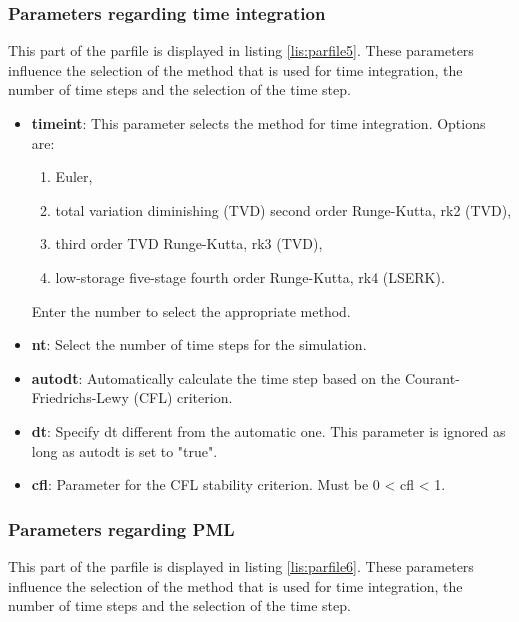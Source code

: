 		\subsubsection{Parameters regarding time integration}
			This part of the parfile is displayed in listing \ref{lis:parfile5}. These parameters influence the selection of the method that is used for time integration, the number of time steps and the selection of the time step. 
			 
    	\begin{itemize}
    		\item \textbf{timeint}: This parameter selects the method for time integration. Options are:
  			\begin{enumerate}
  				\item Euler,
  				\item total variation diminishing (TVD) second order Runge-Kutta, rk2 (TVD),
  				\item third order TVD Runge-Kutta, rk3 (TVD),
  				\item low-storage five-stage fourth order Runge-Kutta, rk4 (LSERK).
  			\end{enumerate}
  			Enter the number to select the appropriate method.
  			\item \textbf{nt}: Select the number of time steps for the simulation.
  			\item \textbf{autodt}: Automatically calculate the time step based on the Courant-Friedrichs-Lewy (CFL) criterion.
  			\item \textbf{dt}: Specify dt different from the automatic one. This parameter is ignored as long as autodt is set to "true". 
  			\item \textbf{cfl}: Parameter for the CFL stability criterion. Must be 0 < cfl < 1. %
    	\end{itemize}
		\subsubsection{Parameters regarding PML}
			This part of the parfile is displayed in listing \ref{lis:parfile6}. These parameters influence the selection of the method that is used for time integration, the number of time steps and the selection of the time step. 
			 
    
